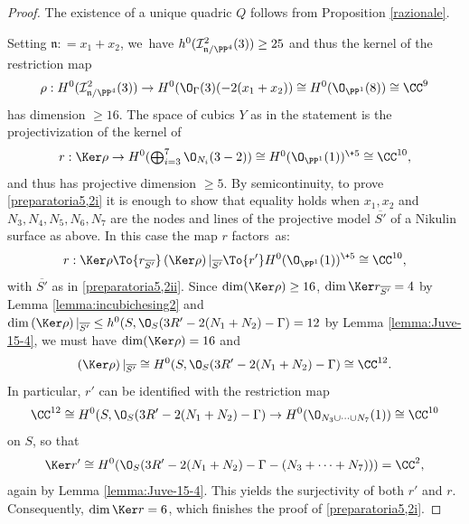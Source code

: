 \begin{proof}
The existence of a unique quadric $Q$ follows from Proposition \ref{razionale}.

Setting $\mathfrak{n}: = x_1 + x_2 $, we~have $h^0(\mathcal I^2_{\mathfrak{n}/\PP^4}(3))\geq 25$ and thus the kernel of the
restriction map
\begin{equation} \label{eq:rho4,4}
\rho: H^0(\mathcal I^2_{\mathfrak{n}/\PP^4}(3)) \to
H^0(\mathcal \O_{\Gamma}(3)(-2(x_1+x_2))\cong H^0(\O_{\PP^1}(8)) \cong \CC^9
\end{equation}
has dimension $\geq16$. The space of cubics $Y$ as in the statement is the projectivization of the kernel of
\begin{equation} \label{eq:restr2}
r: \Ker \rho \to H^0(\textstyle\bigoplus_{i=3}^7 \O_{N_i}(3-2))
\cong H^0(\O_{\PP^1}(1))^{\+ 5} \cong \CC^{10},
\end{equation}
and thus has projective dimension $\geq 5$. By semicontinuity, to prove \eqref{preparatoria5,2i} it is enough to show that equality holds when $x_1,x_2$ and $N_3,N_4,N_5,N_6,N_7$ are the nodes and lines of the projective model $\overline{S'}$ of a Nikulin surface as above. In this case the map $r$ factors~as:
\begin{equation}\label{fact} r: \Ker \rho \To{r_{\overline{S'}}}
\left(\Ker \rho\right)|_{\overline{S'}} \To{r'} H^0(\O_{\PP^1}(1))^{\+ 5} \cong \CC^{10},\end{equation}
with $\overline{S'}$ as in \eqref{preparatoria5,2ii}.
Since $\dim (\Ker \rho) \geq 16$, $\dim \Ker r_{\overline{S'}}=4$ by Lemma \ref{lemma:incubichesing2} and $\dim \left(\Ker \rho\right)|_{\overline{S'}} \leq h^0(S,\O_S(3R'-2(N_1+N_2)-\Gamma)=12$ by Lemma \ref{lemma:Juve-15-4},
we must have
$\dim (\Ker \rho) =16$ and
\[
 \left(\Ker \rho\right)|_{\overline{S'}} \cong H^0(S,\O_S(3R'-2(N_1+N_2)-\Gamma) \cong \CC^{12}.
\]
In particular, $r'$ can be identified with the restriction map
\[
 \CC^{12} \cong H^0(S,\O_S(3R'-2(N_1+N_2)-\Gamma) \to H^0(\O_{N_3 \cup \dots \cup N_7}(1)) \cong \CC^{10}
\]
on $S$, so that
\[
 \Ker r' \cong H^0(\O_S(3R'-2(N_1+N_2)-\Gamma-(N_3+\cdots+N_7)))=\CC^2,
\]
again by Lemma \ref{lemma:Juve-15-4}. This yields the surjectivity of both $r'$ and $r$. Consequently, $\dim \Ker r =6$, which finishes the proof of \eqref{preparatoria5,2i}.


\end{proof}
